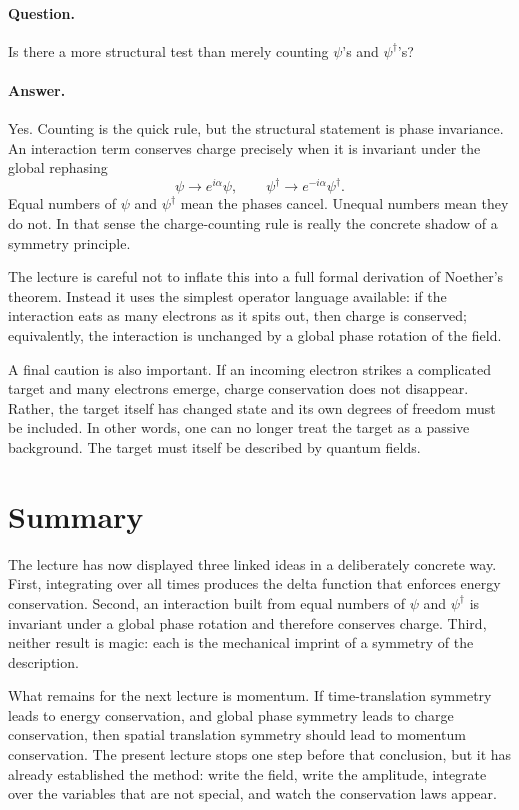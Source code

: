 \paragraph{Question.} Is there a more structural test than merely counting \(\psi\)'s and \(\psi^\dagger\)'s?

\paragraph{Answer.} Yes. Counting is the quick rule, but the structural statement is phase invariance. An interaction term conserves charge precisely when it is invariant under the global rephasing
\[
\psi\to e^{i\alpha}\psi,
\qquad
\psi^\dagger\to e^{-i\alpha}\psi^\dagger.
\]
Equal numbers of \(\psi\) and \(\psi^\dagger\) mean the phases cancel. Unequal numbers mean they do not. In that sense the charge-counting rule is really the concrete shadow of a symmetry principle.

The lecture is careful not to inflate this into a full formal derivation of Noether's theorem. Instead it uses the simplest operator language available: if the interaction eats as many electrons as it spits out, then charge is conserved; equivalently, the interaction is unchanged by a global phase rotation of the field.

A final caution is also important. If an incoming electron strikes a complicated target and many electrons emerge, charge conservation does not disappear. Rather, the target itself has changed state and its own degrees of freedom must be included. In other words, one can no longer treat the target as a passive background. The target must itself be described by quantum fields.

\section{Summary}

The lecture has now displayed three linked ideas in a deliberately concrete way. First, integrating over all times produces the delta function that enforces energy conservation. Second, an interaction built from equal numbers of \(\psi\) and \(\psi^\dagger\) is invariant under a global phase rotation and therefore conserves charge. Third, neither result is magic: each is the mechanical imprint of a symmetry of the description.

What remains for the next lecture is momentum. If time-translation symmetry leads to energy conservation, and global phase symmetry leads to charge conservation, then spatial translation symmetry should lead to momentum conservation. The present lecture stops one step before that conclusion, but it has already established the method: write the field, write the amplitude, integrate over the variables that are not special, and watch the conservation laws appear.